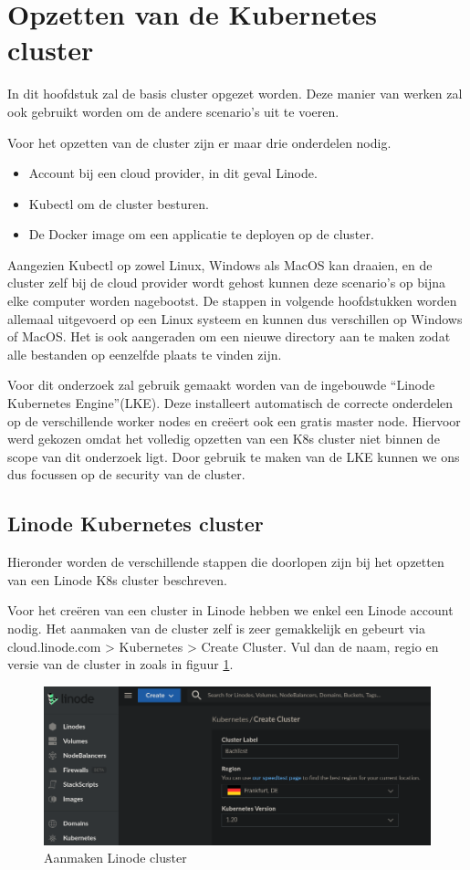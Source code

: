 \section{Opzetten van de Kubernetes cluster}
In dit hoofdstuk zal de basis cluster opgezet worden. Deze manier van werken zal ook gebruikt worden om de andere scenario's uit te voeren.

Voor het opzetten van de cluster zijn er maar drie onderdelen nodig. 
\begin{itemize}
	\item Account bij een cloud provider, in dit geval Linode.
	\item Kubectl om de cluster besturen.
	\item De Docker image om een applicatie te deployen op de cluster.
\end{itemize}

Aangezien Kubectl op zowel Linux, Windows als MacOS kan draaien, en de cluster zelf bij de cloud provider wordt gehost kunnen deze scenario's op bijna elke computer worden nagebootst. De stappen in volgende hoofdstukken worden allemaal uitgevoerd op een Linux systeem en kunnen dus verschillen op Windows of MacOS. Het is ook aangeraden om een nieuwe directory aan te maken zodat alle bestanden op eenzelfde plaats te vinden zijn.

Voor dit onderzoek zal gebruik gemaakt worden van de ingebouwde ``Linode Kubernetes Engine''(LKE). Deze installeert automatisch de correcte onderdelen op de verschillende worker nodes en creëert ook een gratis master node. Hiervoor werd gekozen omdat het volledig opzetten van een K8s cluster niet binnen de scope van dit onderzoek ligt. Door gebruik te maken van de LKE kunnen we ons dus focussen op de security van de cluster. 

\subsection{Linode Kubernetes cluster}
Hieronder worden de verschillende stappen die doorlopen zijn bij het opzetten van een Linode K8s cluster beschreven.

Voor het creëren van een cluster in Linode hebben we enkel een Linode account nodig. Het aanmaken van de cluster zelf is zeer gemakkelijk en gebeurt via cloud.linode.com > Kubernetes > Create Cluster. Vul dan de naam, regio en versie van de cluster in zoals in figuur \ref{fig:LinodeNaam}.

\begin{figure}[h]
	\centering
	\includegraphics[width=\linewidth]{img/LinodeClusterNaam.png}
	\caption{Aanmaken Linode cluster}
	\label{fig:LinodeNaam}
\end{figure}

